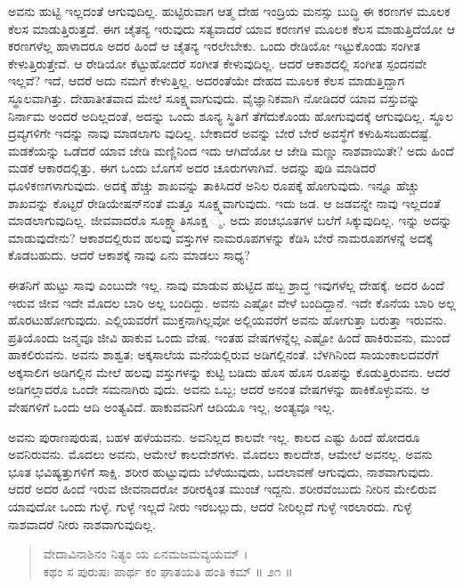 ಅವನು ಹುಟ್ಟಿ ಇಲ್ಲದಂತೆ ಆಗುವುದಿಲ್ಲ. ಹುಟ್ಟಿರುವಾಗ ಆತ್ಮ ದೇಹ ಇಂದ್ರಿಯ ಮನಸ್ಸು ಬುದ್ಧಿ ಈ ಕರಣಗಳ ಮೂಲಕ ಕೆಲಸ ಮಾಡುತ್ತಿರುತ್ತದೆ. ಈಗ ಚೈತನ್ಯ ಇರುವುದು ಸತ್ಯವಾದರೆ ಯಾವ ಕರಣಗಳ ಮೂಲಕ ಕೆಲಸ ಮಾಡುತ್ತಿದೆಯೋ ಆ ಕರಣಗಳೆಲ್ಲ ಹಾಳಾದರೂ ಅದರ ಹಿಂದೆ ಆ ಚೈತನ್ಯ ಇರಲೇಬೇಕು. ಒಂದು ರೇಡಿಯೋ ಇಟ್ಟುಕೊಂಡು ಸಂಗೀತ ಕೇಳುತ್ತಿರುತ್ತೇವೆ. ಆ ರೇಡಿಯೋ ಕೆಟ್ಟುಹೋದರೆ ಸಂಗೀತ ಕೇಳುವುದಿಲ್ಲ. ಆದರೆ ಆಕಾಶದಲ್ಲಿ ಸಂಗೀತ ಸ್ಪಂದನವೇ ಇಲ್ಲವೆ? ಇದೆ, ಆದರೆ ಅದು ನಮಗೆ ಕೇಳುತ್ತಿಲ್ಲ. ಅದರಂತೆಯೇ ದೇಹದ ಮೂಲಕ ಕೆಲಸ ಮಾಡುತ್ತಿದ್ದಾಗ ಸ್ಥೂಲವಾಗಿತ್ತು. ದೇಹಾತೀತವಾದ ಮೇಲೆ ಸೂಕ್ಷ್ಮವಾಗುವುದು. ವೈಜ್ಞಾನಿಕವಾಗಿ ನೋಡಿದರೆ ಯಾವ ವಸ್ತುವನ್ನು ನಿರ್ನಾಮ ಅಂದರೆ ಅದಿಲ್ಲದಂತೆ, ಅದನ್ನು ಒಂದು ಶೂನ್ಯ ಸ್ಥಿತಿಗೆ ತೆಗೆದುಕೊಂಡು ಹೋಗುವುದಕ್ಕೆ ಆಗುವುದಿಲ್ಲ. ಸ್ಥೂಲ ದ್ರವ್ಯಗಳಿಗೇ ಇದನ್ನು ನಾವು ಮಾಡಲಾಗು ವುದಿಲ್ಲ. ಬೇಕಾದರೆ ಅವನ್ನು ಬೇರೆ ಬೇರೆ ಅವಸ್ಥೆಗೆ ಕಳುಹಿಸಬಹುದಷ್ಟೆ. ಮಡಕೆಯನ್ನು ಒಡೆದರೆ ಯಾವ ಜೇಡಿ ಮಣ್ಣಿನಿಂದ ಇದು ಆಗಿದೆಯೋ ಆ ಜೇಡಿ ಮಣ್ಣು ನಾಶವಾಯಿತೇ? ಅದು ಹಿಂದೆ ಮಡಕೆ ಆಕಾರದಲ್ಲಿತ್ತು. ಈಗ ಒಂದು ಬೊಗಸೆ ಅದರ ಚೂರುಗಳಾಗಿವೆ. ಅದನ್ನು ಪುಡಿ ಮಾಡಿದರೆ ಧೂಳಿಕಣಗಳಾಗುವುದು. ಅದಕ್ಕೆ ಹೆಚ್ಚು ಶಾಖವನ್ನು ತಾಕಿಸಿದರೆ ಅನಿಲ ರೂಪಕ್ಕೆ ಹೋಗುವುದು. ಇನ್ನೂ ಹೆಚ್ಚು ಶಾಖವನ್ನು ಕೊಟ್ಟರೆ ರೇಡಿಯೇಷನ್​ನಂತೆ ಮತ್ತೂ ಸೂಕ್ಷ್ಮವಾಗುವುದು. ಇದು ಜಡ. ಆ ಜಡವನ್ನೇ ನಾವು ಇಲ್ಲದಂತೆ ಮಾಡಲಾಗುವುದಿಲ್ಲ. ಜೀವವಾದರೊ ಸೂಕ್ಷ್ಮಾತಿಸೂಕ್ಷ ್ಮ. ಅದು ಪಂಚಭೂತಗಳ ಬಲೆಗೆ ಸಿಕ್ಕುವುದಿಲ್ಲ. ಇನ್ನು ಅದನ್ನು ಮಾಡುವುದೇನು? ಆಕಾಶದಲ್ಲಿರುವ ಹಲವು ವಸ್ತುಗಳ ನಾಮರೂಪಗಳನ್ನು ಕೆಡಿಸಿ ಬೇರೆ ನಾಮರೂಪಗಳನ್ನೆ ಅದಕ್ಕೆ ಕೊಡಬಹುದು. ಆದರೆ ಆಕಾಶಕ್ಕೆ ನಾವು ಏನು ಮಾಡಲು ಸಾಧ್ಯ?

ಈತನಿಗೆ ಹುಟ್ಟು ಸಾವು ಎಂಬುದೇ ಇಲ್ಲ. ನಾವು ಮಾಡುವ ಹುಟ್ಟಿದ ಹಬ್ಬ ಶ್ರಾದ್ಧ ಇವುಗಳೆಲ್ಲ ದೇಹಕ್ಕೆ. ಅದರ ಹಿಂದೆ ಇರುವ ಜೀವ ಇದೇ ಮೊದಲ ಬಾರಿ ಅಲ್ಲ ಬಂದಿದ್ದು. ಅವನು ಎಷ್ಟೋ ವೇಳೆ ಬಂದಿದ್ದಾನೆ. ಇದೇ ಕೊನೆಯ ಬಾರಿ ಅಲ್ಲ ಹೊರಟುಹೋಗುವುದು. ಎಲ್ಲಿಯವರೆಗೆ ಮುಕ್ತನಾಗಿಲ್ಲವೋ ಅಲ್ಲಿಯವರೆಗೆ ಅವನು ಹೋಗುತ್ತಾ ಬರುತ್ತಾ ಇರುವನು. ಪ್ರತಿಯೊಂದು ಜನ್ಮವೂ ಜೀವಿ ಹಾಕುವ ಒಂದು ವೇಷ. ಇಂತಹ ವೇಷಗಳನ್ನೆಲ್ಲ ಎಷ್ಟೋ ಹಿಂದೆ ಹಾಕಿರುವನು, ಮುಂದೆ ಹಾಕಲಿರುವನು. ಅವನು ಶಾಶ್ವತ; ಅಕ್ಕಸಾಲೆಯ ಮನೆಯಲ್ಲಿರುವ ಅಡಿಗಲ್ಲಿನಂತೆ. ಬೆಳಗಿನಿಂದ ಸಾಯಂಕಾಲದವರೆಗೆ ಅಕ್ಕಸಾಲಿಗ ಅಡಿಗಲ್ಲಿನ ಮೇಲೆ ಹಲವು ವಸ್ತುಗಳನ್ನು ಕುಟ್ಟಿ ಬಡಿದು ಹೊಸ ಹೊಸ ರೂಪನ್ನು ಕೊಡುತ್ತಿರುವನು. ಆದರೆ ಅಡಿಗಲ್ಲಾದರೊ ಒಂದೇ ಸಮನಾಗಿರು ವುದು. ಅವನು ಒಬ್ಬ; ಆದರೆ ಅನಂತ ವೇಷಗಳನ್ನು ಹಾಕಿಕೊಳ್ಳುವನು. ಆ ವೇಷಗಳಿಗೆ ಒಂದು ಆದಿ ಅಂತ್ಯವಿದೆ. ಹಾಕುವವನಿಗೆ ಆದಿಯೂ ಇಲ್ಲ, ಅಂತ್ಯವೂ ಇಲ್ಲ.

ಅವನು ಪುರಾಣಪುರುಷ, ಬಹಳ ಹಳೆಯವನು. ಅವನಿಲ್ಲದ ಕಾಲವೇ ಇಲ್ಲ. ಕಾಲದ ಎಷ್ಟು ಹಿಂದೆ ಹೋದರೂ ಅವನಿರುವನು. ಮೊದಲು ಅವನು, ಆಮೇಲೆ ಕಾಲದೇಶಗಳು. ಮೊದಲು ಕಾಲದೇಶ, ಆಮೇಲೆ ಅವನಲ್ಲ. ಅವನು ಭೂತ ಭವಿಷ್ಯತ್ತುಗಳಿಗೆ ಸಾಕ್ಷಿ. ಶರೀರ ಹುಟ್ಟುವುದು ಬೆಳೆಯುವುದು, ಬದಲಾವಣೆ ಆಗುವುದು, ನಾಶವಾಗುವುದು. ಆದರೆ ಅದರ ಹಿಂದೆ ಇರುವ ಜೀವನಾದರೋ ಶರೀರಕ್ಕಿಂತ ಮುಂಚೆ ಇದ್ದನು. ಶರೀರವೆಂಬುದು ನೀರಿನ ಮೇಲಿರುವ ಯಾವುದೋ ಒಂದು ಗುಳ್ಳೆ. ಗುಳ್ಳೆ ಇಲ್ಲದೆ ನೀರು ಇರಬಲ್ಲುದು, ಆದರೆ ನೀರಿಲ್ಲದೆ ಗುಳ್ಳೆ ಇರಲಾರದು. ಗುಳ್ಳೆ ನಾಶವಾದರೆ ನೀರು ನಾಶವಾಗುವುದಿಲ್ಲ.

\begin{verse}
ವೇದಾವಿನಾಶಿನಂ ನಿತ್ಯಂ ಯ ಏನಮಜಮವ್ಯಯಮ್ ।\\ಕಥಂ ಸ ಪುರುಷಃ ಪಾರ್ಥ ಕಂ ಘಾತಯತಿ ಹಂತಿ ಕಮ್ \num{॥ ೨೧ ॥}
\end{verse}


